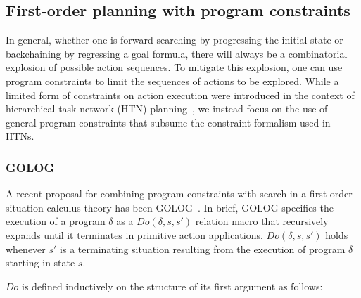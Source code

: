 

\subsection{First-order planning with program constraints}

In general, whether one is forward-searching by progressing the
initial state or backchaining by regressing a goal formula, there will
always be a combinatorial explosion of possible action sequences.  To
mitigate this explosion, one can use program constraints to limit the
sequences of actions to be explored.  While a limited form of
constraints on action execution were introduced in the context of
hierarchical task network (HTN) planning~\cite{erol94htn}, we instead
focus on the use of general program constraints that subsume the
constraint formalism used in HTNs.

\subsubsection{GOLOG}

A recent proposal for combining program constraints with search in a
first-order situation calculus theory has been GOLOG~\cite{golog}.  In
brief, GOLOG specifies the execution of a program $\delta$ as a
$Do(\delta,s,s')$ relation macro that recursively expands until it
terminates in primitive action applications.  
$Do(\delta,s,s')$ holds whenever $s'$ is a terminating situation
resulting from the execution of program $\delta$ starting in state $s$.

$Do$ is defined inductively on the structure of its first argument as follows:

